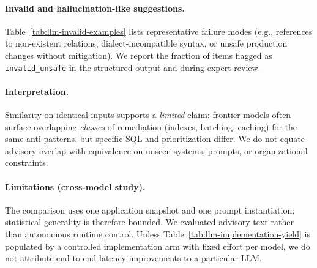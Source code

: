 \paragraph{Invalid and hallucination-like suggestions.}
Table~\ref{tab:llm-invalid-examples} lists representative failure modes (e.g., references to non-existent relations, dialect-incompatible syntax, or unsafe production changes without mitigation).
We report the fraction of items flagged as \texttt{invalid\_unsafe} in the structured output and during expert review.

\paragraph{Interpretation.}
Similarity on identical inputs supports a \emph{limited} claim: frontier models often surface overlapping \emph{classes} of remediation (indexes, batching, caching) for the same anti-patterns, but specific SQL and prioritization differ.
We do not equate advisory overlap with equivalence on unseen systems, prompts, or organizational constraints.

\paragraph{Limitations (cross-model study).}
The comparison uses one application snapshot and one prompt instantiation; statistical generality is therefore bounded.
We evaluated advisory text rather than autonomous runtime control.
Unless Table~\ref{tab:llm-implementation-yield} is populated by a controlled implementation arm with fixed effort per model, we do not attribute end-to-end latency improvements to a particular LLM.

